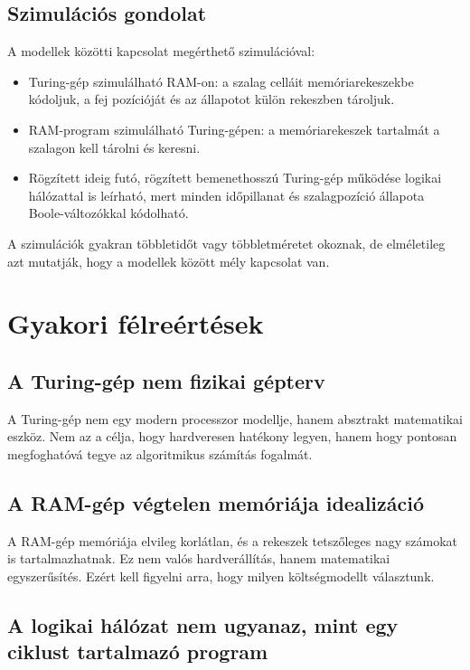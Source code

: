 \subsection{Szimulációs gondolat}

A modellek közötti kapcsolat megérthető szimulációval:

\begin{itemize}
  \item Turing-gép szimulálható RAM-on: a szalag celláit memóriarekeszekbe kódoljuk, a fej pozícióját és az állapotot külön rekeszben tároljuk.
  \item RAM-program szimulálható Turing-gépen: a memóriarekeszek tartalmát a szalagon kell tárolni és keresni.
  \item Rögzített ideig futó, rögzített bemenethosszú Turing-gép működése logikai hálózattal is leírható, mert minden időpillanat és szalagpozíció állapota Boole-változókkal kódolható.
\end{itemize}

A szimulációk gyakran többletidőt vagy többletméretet okoznak, de elméletileg azt mutatják, hogy a modellek között mély kapcsolat van.

\section{Gyakori félreértések}

\subsection{A Turing-gép nem fizikai gépterv}

A Turing-gép nem egy modern processzor modellje, hanem absztrakt matematikai eszköz. Nem az a célja, hogy hardveresen hatékony legyen, hanem hogy pontosan megfoghatóvá tegye az algoritmikus számítás fogalmát.

\subsection{A RAM-gép végtelen memóriája idealizáció}

A RAM-gép memóriája elvileg korlátlan, és a rekeszek tetszőleges nagy számokat is tartalmazhatnak. Ez nem valós hardverállítás, hanem matematikai egyszerűsítés. Ezért kell figyelni arra, hogy milyen költségmodellt választunk.

\subsection{A logikai hálózat nem ugyanaz, mint egy ciklust tartalmazó program}

